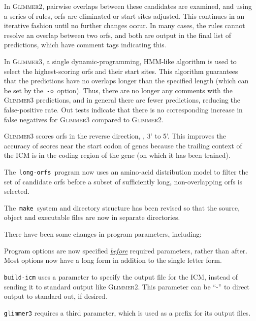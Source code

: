 \documentclass[fleqn,titlepage,11pt]{article}
\def\Gtwo{\textsc{Glimmer2}}
\def\Gthree{\textsc{Glimmer3}}
\def\PgBICM{\texttt{build-icm}}
\def\Pg#1{\texttt{#1}}
\begin{document}
  In \Gtwo{},
  pairwise overlaps between these candidates are examined, and using
  a series of rules, orfs are eliminated or start sites adjusted.
  This continues in an iterative fashion until no further
  changes occur.  In many cases, the rules cannot resolve an
  overlap between two orfs, and both are output in the final
  list of predictions, which have comment tags indicating this.

  In \Gthree{}, a single dynamic-programming, HMM-like algorithm
  is used to select the highest-scoring orfs and their
  start sites.  This algorithm guarantees that the predictions
  have no overlaps longer than the specified length (which
  can be set by the
  \,\verb`-o`\, option).  Thus, there are no longer any comments
  with the \Gthree{} predictions, and in general there are fewer
  predictions, reducing the false-positive rate.  Out tests
  indicate that there is no corresponding increase in false
  negatives for \Gthree{} compared to \Gtwo{}.
  
\item
  \Gthree{} scores orfs in the reverse direction, \ie, 3' to
  5'.  This improves the accuracy of scores near the start codon
  of genes because the trailing context of the ICM is in
  the coding region of the gene (on which it has been trained).

\item
  The \,\verb`long-orfs`\, program now uses an
  amino-acid distribution model to filter
  the set of candidate orfs before a subset of sufficiently
  long, non-overlapping orfs is selected.

\item
  The \,\verb`make`\, system and directory structure has been
  revised so that the source, object and executable files
  are now in separate directories.

\item
  There have been some changes in program parameters, including:
  \bn\RaggedRight
  \item
    Program options are now specified \underline{\emph{before}}
    required parameters, rather than after.  Most options now
    have a long form in addition to the single letter form.
  \item
    \PgBICM{} uses a parameter to specify the output file for
    the ICM, instead of sending it to standard output like
    \Gtwo{}.  This parameter can be ``-'' to direct output to
    standard out, if desired.
  \item
    \Pg{glimmer3} requires a third parameter, which is used as a
    prefix for its output files.
  \en
\end{document}

